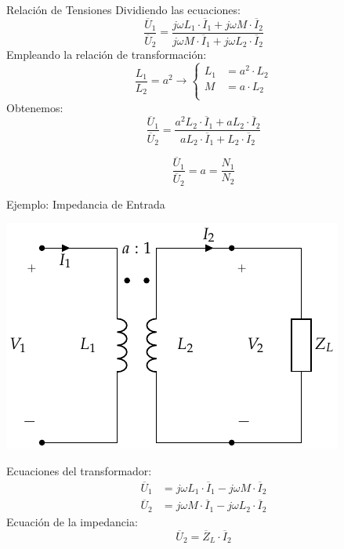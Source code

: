 \documentclass[xcolor={usenames,svgnames,dvipsnames}]{beamer}
\begin{document}
\begin{frame}[label={sec:org933d811}]{Relación de Tensiones}
Dividiendo las ecuaciones:
\[
  \frac{\overline{U}_1}{\overline{U}_2} = \frac{j \omega L_1 \cdot \overline{I}_1 + j \omega M \cdot \overline{I}_2}{j \omega M \cdot \overline{I}_1 + j \omega L_2 \cdot \overline{I}_2}
\]
Empleando la relación de transformación:
\[
  \frac{L_1}{L_2} = a^2
  \rightarrow
  \left\{
  \begin{array}{ll}
    L_1 &= a^2 \cdot L_2\\
    M &= a \cdot L_2\\
  \end{array}\right.
\]
Obtenemos:
\[
  \frac{\overline{U}_1}{\overline{U}_2} = \frac{a^2 L_2 \cdot \overline{I}_1 + a L_2 \cdot \overline{I}_2}{a L_2 \cdot \overline{I}_1 + L_2 \cdot \overline{I}_2}
\]

\[
  \boxed{\frac{\overline{U}_1}{\overline{U}_2} = a = \frac{N_1}{N_2}}
\]
\end{frame}
\begin{frame}[label={sec:org9ca8fe8}]{Ejemplo: Impedancia de Entrada}
\begin{center}
\includegraphics[height=0.45\textheight]{../figs/TrafoPerfecto_ImpedanciaSecundario.pdf}
\end{center}

Ecuaciones del transformador:
\begin{align*}
  \overline{U}_1 &= j \omega L_1 \cdot \overline{I}_1 - j \omega M \cdot \overline{I}_2\\
  \overline{U}_2 &= j \omega M \cdot \overline{I}_1 - j \omega L_2 \cdot \overline{I}_2
\end{align*}
Ecuación de la impedancia:
\[
  \overline{U}_2 = \overline{Z}_L \cdot \overline{I}_2
\]
\end{frame}
\end{document}
